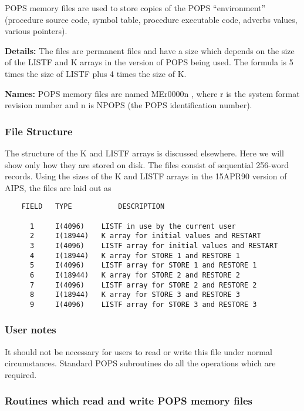  POPS memory files are used to store copies of the POPS
``environment'' (procedure source code, symbol table, procedure
executable code, adverbs values, various pointers).

{\bf Details:}  The files are permanent files and have a
size which depends on the size of the LISTF and K arrays in the version
of POPS being used.  The formula is 5 times the size of LISTF plus 4
times the size of K.

{\bf Names:}  POPS memory files are named MEr0000n , where r is the system
format revision number and n is NPOPS (the POPS identification number).


\subsubsection{File Structure}


     The structure of the K and LISTF arrays is discussed elsewhere.
Here we will show only how they are stored on disk.  The files consist
of sequential 256-word records.  Using the sizes of the K and LISTF
arrays in the 15APR90 version of AIPS, the files are laid out
as
\begin{verbatim}
    FIELD   TYPE           DESCRIPTION

      1     I(4096)    LISTF in use by the current user
      2     I(18944)   K array for initial values and RESTART
      3     I(4096)    LISTF array for initial values and RESTART
      4     I(18944)   K array for STORE 1 and RESTORE 1
      5     I(4096)    LISTF array for STORE 1 and RESTORE 1
      6     I(18944)   K array for STORE 2 and RESTORE 2
      7     I(4096)    LISTF array for STORE 2 and RESTORE 2
      8     I(18944)   K array for STORE 3 and RESTORE 3
      9     I(4096)    LISTF array for STORE 3 and RESTORE 3
\end{verbatim}


\subsubsection{User notes}


     It should not be necessary for users to read or write this file
under normal circumstances.  Standard POPS subroutines do all the
operations which are required.



\subsubsection{Routines which read and write POPS memory files}


